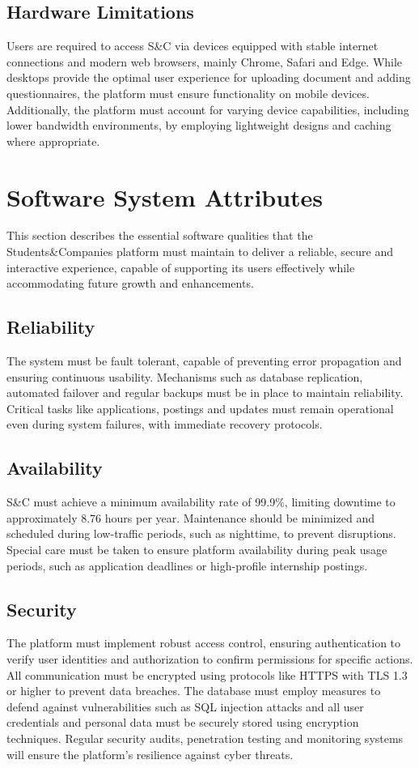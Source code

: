 \subsection{Hardware Limitations}
Users are required to access S\&C via devices equipped with stable internet connections and modern web browsers, mainly Chrome, Safari and Edge.
While desktops provide the optimal user experience for uploading document and adding questionnaires, the platform must ensure functionality on mobile devices.
Additionally, the platform must account for varying device capabilities, including lower bandwidth environments, by employing lightweight designs and caching where appropriate.

\section{Software System Attributes}
This section describes the essential software qualities that the Students\&Companies platform must maintain to deliver a reliable, secure and interactive experience, capable of supporting its users effectively while accommodating future growth and enhancements.

\subsection{Reliability}
The system must be fault tolerant, capable of preventing error propagation and ensuring continuous usability.
Mechanisms such as database replication, automated failover and regular backups must be in place to maintain reliability.
Critical tasks like applications, postings and updates must remain operational even during system failures, with immediate recovery protocols.

\subsection{Availability}
S\&C must achieve a minimum availability rate of 99.9\%, limiting downtime to approximately 8.76 hours per year.
Maintenance should be minimized and scheduled during low-traffic periods, such as nighttime, to prevent disruptions.
Special care must be taken to ensure platform availability during peak usage periods, such as application deadlines or high-profile internship postings.

\subsection{Security}
The platform must implement robust access control, ensuring authentication to verify user identities and authorization to confirm permissions for specific actions.
All communication must be encrypted using protocols like HTTPS with TLS 1.3 or higher to prevent data breaches.
The database must employ measures to defend against vulnerabilities such as SQL injection attacks and all user credentials and personal data must be securely stored using encryption techniques.
Regular security audits, penetration testing and monitoring systems will ensure the platform's resilience against cyber threats.

